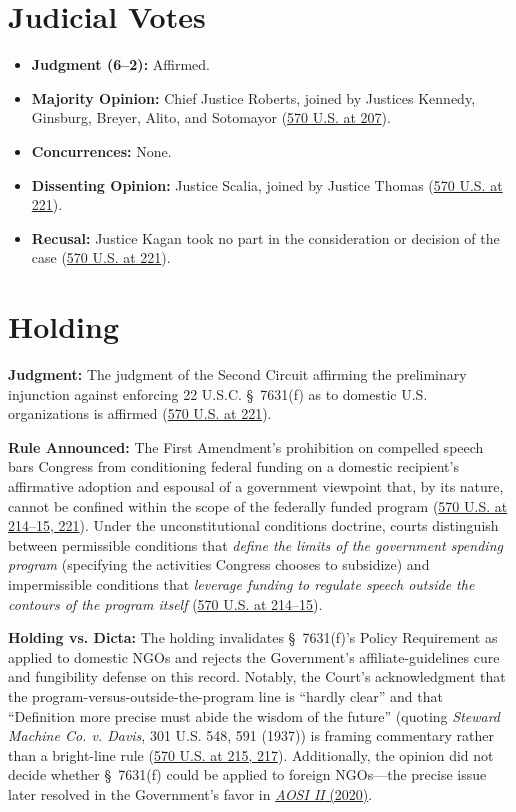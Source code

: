 \documentclass[12pt]{article}
\begin{document}
\section{Judicial Votes}
\begin{itemize}
  \item \textbf{Judgment (6--2):} Affirmed.
  \item \textbf{Majority Opinion:} Chief Justice Roberts, joined by Justices Kennedy, Ginsburg, Breyer, Alito, and Sotomayor (\href{https://supreme.justia.com/cases/federal/us/570/205/}{570 U.S. at 207}).
  \item \textbf{Concurrences:} None.
  \item \textbf{Dissenting Opinion:} Justice Scalia, joined by Justice Thomas (\href{https://supreme.justia.com/cases/federal/us/570/205/}{570 U.S. at 221}).
  \item \textbf{Recusal:} Justice Kagan took no part in the consideration or decision of the case (\href{https://supreme.justia.com/cases/federal/us/570/205/}{570 U.S. at 221}).
\end{itemize}

\section{Holding}
\textbf{Judgment:} The judgment of the Second Circuit affirming the preliminary injunction against enforcing 22 U.S.C. \S~7631(f) as to domestic U.S. organizations is affirmed (\href{https://supreme.justia.com/cases/federal/us/570/205/}{570 U.S. at 221}).

\textbf{Rule Announced:} The First Amendment's prohibition on compelled speech bars Congress from conditioning federal funding on a domestic recipient's affirmative adoption and espousal of a government viewpoint that, by its nature, cannot be confined within the scope of the federally funded program (\href{https://supreme.justia.com/cases/federal/us/570/205/}{570 U.S. at 214--15, 221}). Under the unconstitutional conditions doctrine, courts distinguish between permissible conditions that \emph{define the limits of the government spending program} (specifying the activities Congress chooses to subsidize) and impermissible conditions that \emph{leverage funding to regulate speech outside the contours of the program itself} (\href{https://supreme.justia.com/cases/federal/us/570/205/}{570 U.S. at 214--15}).

\textbf{Holding vs. Dicta:} The holding invalidates \S~7631(f)'s Policy Requirement as applied to domestic NGOs and rejects the Government's affiliate-guidelines cure and fungibility defense on this record. Notably, the Court's acknowledgment that the program-versus-outside-the-program line is ``hardly clear'' and that ``Definition more precise must abide the wisdom of the future'' (quoting \textit{Steward Machine Co. v. Davis}, 301 U.S. 548, 591 (1937)) is framing commentary rather than a bright-line rule (\href{https://supreme.justia.com/cases/federal/us/570/205/}{570 U.S. at 215, 217}). Additionally, the opinion did not decide whether \S~7631(f) could be applied to foreign NGOs---the precise issue later resolved in the Government's favor in \href{https://supreme.justia.com/cases/federal/us/591/19-177/}{\textit{AOSI II} (2020)}.
\end{document}
